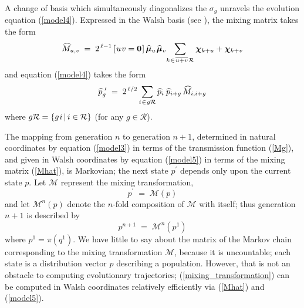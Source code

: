 A change of basis which simultaneously diagonalizes the $\sigma_g$
unravels the evolution equation (\ref{model4}).  
Expressed in the Walsh basis (see \cite{VoseWright1998}), the mixing matrix
takes the form
\begin{equation}
\label{Mhat}
\widehat{M}_{u,v} \; = \; 2^{\,\ell-1} \,[\hspace{0.01in} u \hspace{0.01in} v = {\bf
    0}\hspace{0.01in}]\, \widehat{\bm{\mu}}_u \hspace{0.01in} \widehat{\bm{\mu}}_v \!  \sum_{k
  \hspace{0.01in} \in \hspace{0.01in} \overline{u+v} \hspace{0.01in} \mathcal{R}} \bm{\chi}_{k + u} +
\bm{\chi}_{k + v}
\end{equation}
and equation (\ref{model4}) takes the form
\begin{equation}
\label{model5}
\widehat{p}_g^{\,\,\prime} \; = \; 2^{\,\ell/2} \sum_{i \hspace{0.01in} \in \hspace{0.01in} g \mathcal{R}}
\widehat{p}_i \, \hspace{0.01in} \widehat{p}_{i+g} \,\widehat{M}_{i,i+g}
\end{equation}
where $g \mathcal{R} = \{g \hspace{0.01in} i \, | \, i \in \mathcal{R} \}$ (for
any $g \in \mathcal{R}$).

The mapping from generation $n$ to generation $n+1$, determined in
natural coordinates by equation (\ref{model3}) in terms of the
transmission function (\ref{Mg}), and given in Walsh coordinates by
equation (\ref{model5}) in terms of the mixing matrix (\ref{Mhat}), is
Markovian; the next state $p^\prime$ depends only upon the current
state $p$.  Let $\mathcal{M}$ represent the mixing transformation,
\begin{equation} \label{mixing_transformation}
p^\prime \; = \; \mathcal{M}(p)
\end{equation}
and let $\mathcal{M}^n(p)$ denote the $n$-fold composition of
$\mathcal{M}$ with itself; thus generation $n+1$ is described by
\[
p^{n+1} \; = \; \mathcal{M}^n(p^1)
\]
where $p^1 = \pi (q^1)$.  We have little to say
about the matrix of the Markov chain corresponding to the mixing
transformation $\mathcal{M}$, because it is uncountable; each state is
a distribution vector $p$ describing a population. However, that is
not an obstacle to computing evolutionary trajectories;
(\ref{mixing_transformation}) can be computed in Walsh coordinates
relatively efficiently via (\ref{Mhat}) and (\ref{model5}).

